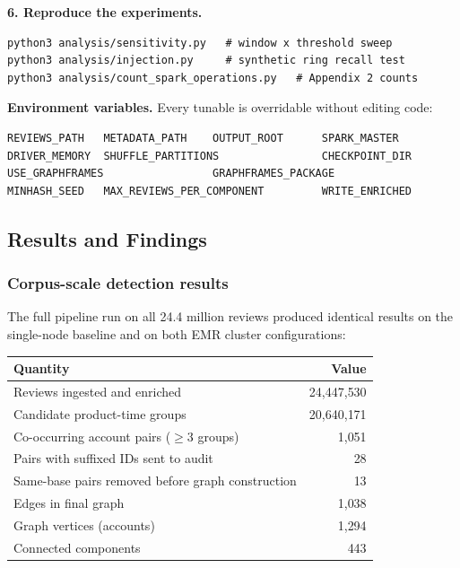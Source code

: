 \documentclass[12pt]{article}
\begin{document}
\textbf{6. Reproduce the experiments.}
\begin{lstlisting}
python3 analysis/sensitivity.py   # window x threshold sweep
python3 analysis/injection.py     # synthetic ring recall test
python3 analysis/count_spark_operations.py   # Appendix 2 counts
\end{lstlisting}

\textbf{Environment variables.} Every tunable is overridable without editing
code:
\begin{lstlisting}
REVIEWS_PATH   METADATA_PATH    OUTPUT_ROOT      SPARK_MASTER
DRIVER_MEMORY  SHUFFLE_PARTITIONS                CHECKPOINT_DIR
USE_GRAPHFRAMES                 GRAPHFRAMES_PACKAGE
MINHASH_SEED   MAX_REVIEWS_PER_COMPONENT         WRITE_ENRICHED
\end{lstlisting}

\subsection{Results and Findings}

\subsubsection{Corpus-scale detection results}

The full pipeline run on all 24.4 million reviews produced identical results
on the single-node baseline and on both EMR cluster configurations:

\begin{center}
\begin{tabular}{@{}lr@{}}
  \toprule
  \textbf{Quantity} & \textbf{Value} \\
  \midrule
  Reviews ingested and enriched        & 24{,}447{,}530 \\
  Candidate product-time groups        & 20{,}640{,}171 \\
  Co-occurring account pairs ($\geq 3$ groups) & 1{,}051 \\
  Pairs with suffixed IDs sent to audit   & 28 \\
  Same-base pairs removed before graph construction & 13 \\
  Edges in final graph                 & 1{,}038 \\
  Graph vertices (accounts)            & 1{,}294 \\
  Connected components                 & 443 \\
  \bottomrule
\end{tabular}
\end{center}
\end{document}
